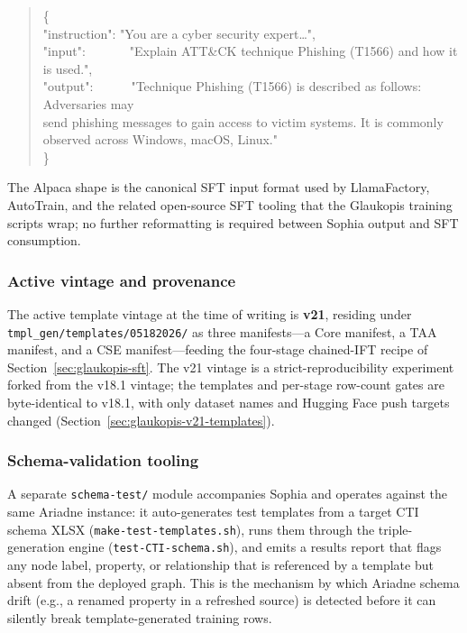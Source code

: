 \documentclass[webpdf,contemporary,large]{oup-authoring-template}
\theoremstyle{thmstyleone}
\theoremstyle{thmstyletwo}
\theoremstyle{thmstylethree}
\begin{document}
\begin{quote}\small\ttfamily
\{\\
\hspace*{1em}"instruction": "You are a cyber security expert\ldots",\\
\hspace*{1em}"input":\ \ \ \ \ \ \ "Explain ATT\&CK technique Phishing (T1566) and how it is used.",\\
\hspace*{1em}"output":\ \ \ \ \ \ "Technique Phishing (T1566) is described as follows: Adversaries may\\
\hspace*{1em}\hspace*{1em}\hspace*{1em} send phishing messages to gain access to victim systems. It is commonly\\
\hspace*{1em}\hspace*{1em}\hspace*{1em} observed across Windows, macOS, Linux."\\
\}
\end{quote}

The Alpaca shape is the canonical SFT input format used by LlamaFactory, AutoTrain, and the related open-source SFT tooling that the Glaukopis training scripts wrap; no further reformatting is required between Sophia output and SFT consumption.

\subsubsection*{Active vintage and provenance}
The active template vintage at the time of writing is \textbf{v21}, residing under \texttt{tmpl\_gen/templates/05182026/} as three manifests---a Core manifest, a TAA manifest, and a CSE manifest---feeding the four-stage chained-IFT recipe of Section~\ref{sec:glaukopis-sft}. The v21 vintage is a strict-reproducibility experiment forked from the v18.1 vintage; the templates and per-stage row-count gates are byte-identical to v18.1, with only dataset names and Hugging Face push targets changed (Section~\ref{sec:glaukopis-v21-templates}).

\subsubsection*{Schema-validation tooling}
A separate \texttt{schema-test/} module accompanies Sophia and operates against the same Ariadne instance: it auto-generates test templates from a target CTI schema XLSX (\texttt{make-test-templates.sh}), runs them through the triple-generation engine (\texttt{test-CTI-schema.sh}), and emits a results report that flags any node label, property, or relationship that is referenced by a template but absent from the deployed graph. This is the mechanism by which Ariadne schema drift (e.g., a renamed property in a refreshed source) is detected before it can silently break template-generated training rows.
\end{document}
